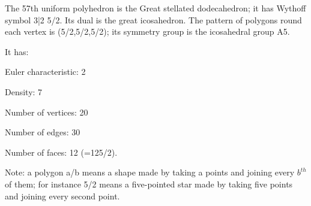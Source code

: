 The 57th uniform polyhedron is the Great stellated dodecahedron; it has Wythoff symbol 3|2 5/2. Its dual is the great icosahedron. The pattern of polygons round each vertex is (5/2,5/2,5/2); its symmetry group is the icosahedral group A5.\par
It has:\par
Euler characteristic: 2\par
Density: 7\par
Number of vertices: 20\par
Number of edges:  30\par
Number of faces: 12 (=12{5/2}).\par
Note: a polygon a/b means a shape made by taking a points and joining every $b^{th}$  of them; for instance 5/2 means a five-pointed star made by taking five points and joining every second point.